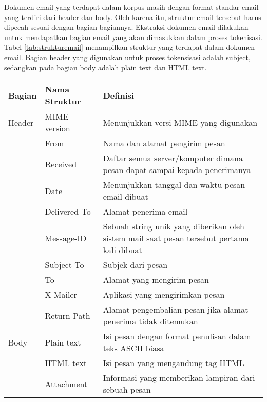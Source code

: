 Dokumen email yang terdapat dalam korpus masih dengan format standar email yang terdiri dari header dan body. Oleh karena itu, struktur email tersebut harus dipecah sesuai dengan bagian-bagiannya. Ekstraksi dokumen email dilakukan untuk mendapatkan bagian email yang akan dimasukkan dalam proses tokenisasi. Tabel \ref{tab:strukturemail} menampilkan struktur yang terdapat dalam dokumen email. Bagian header yang digunakan untuk proses tokensisasi adalah subject, sedangkan pada bagian body adalah plain text dan HTML text.
\begin{table*}[h!]
	\begin{center}
		\caption{Struktur dokumen email}
		\label{tab:strukturemail}
		\small
		\begin{tabular}{l p{3cm} p{8cm}}
			\hline
			Bagian&Nama Struktur&Definisi\\
			\hline
			Header&MIME-version&Menunjukkan versi MIME yang digunakan\\
			&From&Nama dan alamat pengirim pesan\\
			&Received&Daftar semua server/komputer dimana pesan dapat sampai kepada penerimanya\\
			&Date&Menunjukkan tanggal dan waktu pesan email dibuat\\
			&Delivered-To&Alamat penerima email\\
			&Message-ID&Sebuah string unik yang diberikan oleh sistem mail saat pesan tersebut pertama kali dibuat\\
			&Subject To&Subjek dari pesan\\
			&To&Alamat yang mengirim pesan\\
			&X-Mailer&Aplikasi yang mengirimkan pesan\\
			&Return-Path&Alamat pengembalian pesan jika alamat penerima tidak ditemukan\\
			\hline
			Body&Plain text&Isi pesan dengan format penulisan dalam teks ASCII biasa\\
			&HTML text&Isi pesan yang mengandung tag HTML\\
			&Attachment&Informasi yang memberikan lampiran dari sebuah pesan\\
			\hline
		\end{tabular}
		\normalsize
	\end{center}
\end{table*}

